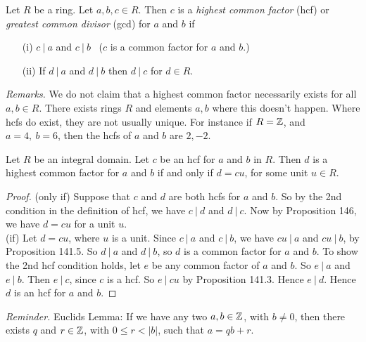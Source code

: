 \documentclass[10pt]{scrartcl}
\begin{document}
 \vsp
\begin{definition} Let $R$ be a ring. Let $a,b,c \in R$. Then $c$ is a \emph{highest common factor} (hcf) or \emph{greatest common divisor} (gcd) for $a$ and $b$ if\begin{enumerate}
\item[(i)] $c ~|~ a$ and $c ~|~ b$	 ~($c$ is a common factor for $a$ and $b$.)
\item[(ii)] If $d ~|~ a$ and $d ~|~ b$ then $d ~|~ c$ for $d \in R$.
\end{enumerate}\end{definition}

 \textit{Remarks.} We do not claim that a highest common factor necessarily exists for all $a,b \in R$. There exists rings $R$ and elements $a,b$ where this doesn't happen. Where hcfs do exist, they are not usually unique. For instance if $R = \mathbb{Z}$, and $a = 4,~ b = 6$, then the hcfs of $a$ and $b$ are $2, -2$. \\

\begin{proposition}Let $R$ be an integral domain. Let $c$ be an hcf for $a$ and $b$ in $R$. Then $d$ is a highest common factor for $a$ and $b$ if and only if $d = cu$, for some unit $u \in R$. 	
\end{proposition}

\begin{proof}
	(only if) Suppose that $c$ and $d$ are both hcfs for $a$ and $b$. So by the 2nd condition in the definition of hcf, we have $c ~|~ d$ and $d ~|~c$. Now by Proposition 146, we have $d = cu$ for a unit $u$. \vspace*{-5pt}\\

	(if) Let $d = cu$, where $u$ is a unit. Since $c ~|~ a$ and $c~|~ b$, we have $cu ~|~ a$ and $cu ~|~ b$, by Proposition 141.5. So $d ~|~ a$ and $d ~|~ b$, so $d$ is a common factor for $a$ and $b$. To show the 2nd hcf condition holds, let $e$ be any common factor of $a$ and $b$. So $e ~|~ a$ and $e ~|~ b$. Then $e ~|~ c$, since $c$ is a hcf. So $e ~|~ cu $ by Proposition 141.3. Hence $e ~|~ d$. Hence $d$ is an hcf for $a$ and $b$.
\end{proof}\vspace*{10pt}


 \textit{Reminder.} Euclids   
 Lemma: If we have any two $a,b\in \mathbb{Z}$, with $b \neq 0$, then there exists $q$ and $r \in \mathbb{Z}$, with  $0 \leq r < |b|$, such that $a = qb + r$.\\
\end{document}

